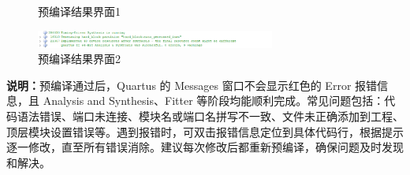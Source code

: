 \documentclass[UTF8]{article}
\theoremstyle{MyLineTheoremStyle} %
\theoremstyle{MyBlockTheoremStyle} %
\theoremstyle{MySubsubsectionStyle} %
\begin{document}
\begin{enumerate}
\begin{figure}[H]
        \caption{预编译结果界面1}
        \label{fig:step3}
    \end{figure}
    \begin{figure}[H]
        \centering
        \includegraphics[width=0.7\textwidth]{step3_2.png}
        \caption{预编译结果界面2}
        \label{fig:step3_2}
    \end{figure}
    \textbf{说明：}预编译通过后，Quartus 的 Messages 窗口不会显示红色的 Error 报错信息，且 Analysis and Synthesis、Fitter 等阶段均能顺利完成。常见问题包括：代码语法错误、端口未连接、模块名或端口名拼写不一致、文件未正确添加到工程、顶层模块设置错误等。遇到报错时，可双击报错信息定位到具体代码行，根据提示逐一修改，直至所有错误消除。建议每次修改后都重新预编译，确保问题及时发现和解决。

\vspace{1cm}
    

\end{enumerate}
\end{document}
